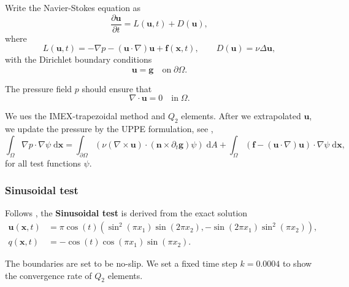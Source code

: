 \documentclass[lang=en,11pt,a4paper,bibend=bibtex]{elegantpaper}
\begin{document}
Write the Navier-Stokes equation as
\begin{equation}
    \frac{\partial \mathbf{u}}{\partial t}=L(\mathbf{u},t)+D(\mathbf{u}),
\end{equation}
where
\begin{equation*}
    L(\mathbf{u},t)=-\nabla p-(\mathbf{u}\cdot\nabla)\mathbf{u}
    +\mathbf{f}(\mathbf{x},t),
    \qquad D(\mathbf{u})=\nu\Delta\mathbf{u},
\end{equation*}
with the Dirichlet boundary conditions
\begin{equation}
    \mathbf{u}=\mathbf{g}\quad \text{on}\;\partial\Omega.
\end{equation}

The pressure field $p$ should ensure that
\begin{equation}
    \nabla\cdot \mathbf{u}=0\quad \text{in}\;\Omega.
\end{equation}

We ues the IMEX-trapezoidal method and $Q_2$ elements. 
After we extrapolated $\mathbf{u}$, we update the pressure by 
the UPPE formulation, see \cite{Liu2010},
\begin{equation}
    \int_\Omega \nabla p \cdot \nabla \psi \;\text{d}\mathbf{x} = 
    \int_{\partial\Omega} (\nu(\nabla \times \mathbf{u}) \cdot 
    (\mathbf{n} \times \partial_t \mathbf{g}) \psi ) \;\text{d}A
    + \int_\Omega (\mathbf{f}-(\mathbf{u}\cdot \nabla)\mathbf{u})
     \cdot \nabla \psi \;\text{d}\mathbf{x},
\end{equation}
for all test functions $\psi$.

\subsubsection{Sinusoidal test}

Follows \cite{Shirokoff2011}, the \textbf{Sinusoidal test} is derived 
from the exact solution
\begin{align}
    \mathbf{u}(\mathbf{x},t) &= \pi \cos(t) \left(
        \sin^2(\pi x_1)\sin(2\pi x_2),
        -\sin(2\pi x_1)\sin^2(\pi x_2)
    \right), \\
    q(\mathbf{x},t) &= -\cos(t) \cos(\pi x_1) \sin(\pi x_2).
\end{align}

The boundaries are set to be no-slip.
We set a fixed time step $k=0.0004$ to show the convergence rate
of $Q_2$ elements.
\end{document}
